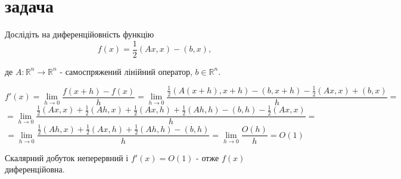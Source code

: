 \section{задача}


\begin{tcolorbox}[title=Умова]
    Дослідіть на диференційовність функцію
    $$
    f(x)=\frac{1}{2}(A x, x)-(b, x),
    $$

    де $A: \mathbb{R}^n \rightarrow \mathbb{R}^n$ - самоспряжений лінійний оператор, $b \in \mathbb{R}^n$.
\end{tcolorbox}


$$f'(x) = \lim_{h \to 0} \frac{f(x+h) - f(x)}{h} = 
\lim_{h \to 0} \frac{
    \frac{1}{2}(A(x+h), x+h) - (b, x+h) - \frac{1}{2}(Ax, x) + (b, x)}{h}=
$$
$$
= \lim_{h \to 0} \frac{
    \frac{1}{2}(Ax, x) + \frac{1}{2}(Ah, x) + \frac{1}{2}(Ax, h) + \frac{1}{2}(Ah, h) - (b, h) - \frac{1}{2}(Ax, x)}{h}=
$$
$$
= \lim_{h \to 0} \frac{
    \frac{1}{2}(Ah, x) + \frac{1}{2}(Ax, h) + \frac{1}{2}(Ah, h) - (b, h)}{h}=
    \lim_{h \to 0}\frac{O(h)}{h} = O(1)
$$

Скалярний добуток неперервний і $f'(x) = O(1)$ - отже $f(x)$ диференційовна.